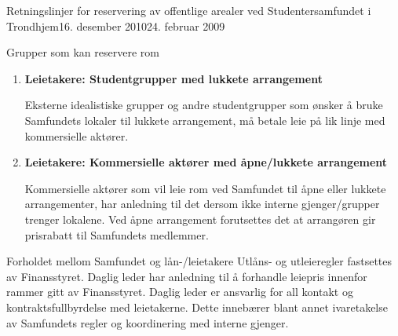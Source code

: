 \begin{instruks}{Retningslinjer for reservering av offentlige arealer
    ved Studentersamfundet i Trondhjem}{16. desember 2010}{24. februar 2009}
\begin{instruksledd}{Grupper som kan reservere rom}
\begin{enumerate}
                Eksterne idealistiske studentgrupper som ønsker å legge sine arrangementer
                til Samfundet
                slipper å betale for romreservasjon under forutsetning av at
                arrangementene er åpne for alle
                Samfundets medlemmer og at arrangør ikke har økonomisk inntjening på
                arrangementet.
                Med ”eksterne idealistiske grupper” forstås i denne instruksen
                studenter/grupper av studenter
                som ikke er tilknyttet gjengene på Samfundet, og som ønsker å legge
                arrangementer av
                kulturell, politisk eller faglig art til Samfundet. Låntakeren skal
                fortrinnsvis være medlem av
                Samfundet, arrangementene skal være åpne for alle våre medlemmer og
                medlemmer skal ha
                rabatt ved eventuell inngangsbillett. Linjeforeningsfester og andre
                lukkede arrangement faller
                inn under utleie (se punkt 3.3 og 3.4).

            \item \textbf{Leietakere: Studentgrupper med lukkete arrangement}

                Eksterne idealistiske grupper og andre studentgrupper som ønsker å bruke
                Samfundets lokaler
                til lukkete arrangement, må betale leie på lik linje med kommersielle
                aktører.

            \item \textbf{ Leietakere: Kommersielle aktører med åpne/lukkete arrangement}

                Kommersielle aktører som vil leie rom ved Samfundet til åpne eller lukkete
                arrangementer,
                har anledning til det dersom ikke interne gjenger/grupper trenger
                lokalene. Ved åpne
                arrangement forutsettes det at arrangøren gir prisrabatt til Samfundets
                medlemmer.
        \end{enumerate}
    \end{instruksledd}

    \begin{instruksledd}{Forholdet mellom Samfundet og lån-/leietakere}
        Utlåns- og utleieregler fastsettes av Finansstyret. Daglig leder har anledning
        til å forhandle
        leiepris innenfor rammer gitt av Finansstyret.
        Daglig leder er ansvarlig for all kontakt og kontraktsfullbyrdelse med
        leietakerne. Dette innebærer blant annet
        ivaretakelse av Samfundets regler og koordinering med interne gjenger.


\end{instruksledd}
\end{instruks}
